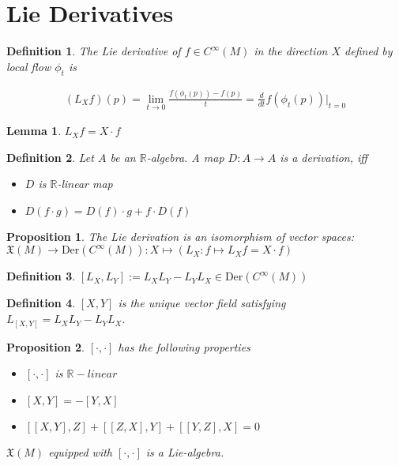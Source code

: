 \documentclass{scrartcl}
\newcommand{\R}{\mathbb R}
\newtheorem*{mydef}{Definition}
\newtheorem*{lemma}{Lemma}
\newtheorem*{prop}{Proposition}
\begin{document}
\section{Lie Derivatives}

\begin{mydef}
  The Lie derivative of $f\in C^\infty(M)$ in the direction $X$ defined by local flow $\phi_t$ is

  \begin{align}
    (L_X f)(p) = \lim_{t\rightarrow0}\frac{f(\phi_t(p))-f(p)}{t} = \frac d{dt} f(\phi_t(p))|_{t=0}
  \end{align}
\end{mydef}

\begin{lemma}
  $L_X f = X\cdot f$
\end{lemma}

\begin{mydef}
  Let $A$ be an $\R$-algebra. A map $D:A\rightarrow A$ is a \emph{derivation}, iff

  \begin{itemize}
  \item $D$ is $\R$-linear map
  \item $D(f\cdot g) = D(f)\cdot g + f \cdot D(f)$
  \end{itemize}
\end{mydef}

\begin{prop}
  The Lie derivation is an isomorphism of vector spaces: $\mathfrak X(M) \rightarrow \mathrm{Der}(C^\infty(M)): X \mapsto (L_X: f \mapsto L_X f = X\cdot f)$
\end{prop}

\begin{mydef}
  $[L_X,L_Y]:=L_XL_Y-L_YL_X\in \mathrm{Der}(C^\infty(M))$ 
\end{mydef}

\begin{mydef}
  $[X,Y]$ is the unique vector field satisfying $L_{[X,Y]}=L_XL_Y-L_YL_X$.
\end{mydef}

\begin{prop}
  $[\cdot,\cdot]$ has the following properties

  \begin{itemize}
  \item $[\cdot,\cdot]$ is $\R-linear$
  \item $[X,Y]=-[Y,X]$
  \item $[[X,Y],Z]+[[Z,X],Y]+[[Y,Z],X]=0$
  \end{itemize}

  $\mathfrak X(M)$ equipped with $[\cdot,\cdot]$ is a Lie-algebra.
\end{prop}
\end{document}
